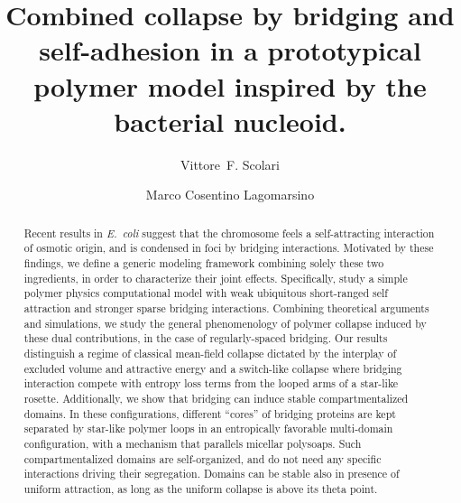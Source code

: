 \documentclass[
preprint,
a4paper,
12pt,
superscriptaddress,
pre]{revtex4}
\begin{document}
 

\title{Combined collapse by bridging and self-adhesion in a
  prototypical polymer model inspired by the bacterial nucleoid.}

\author{Vittore~F. Scolari}
%
%
%
% 
%
\author{Marco Cosentino Lagomarsino}
%

\begin{abstract}
  Recent results in \emph{E.~coli} suggest that the chromosome feels a
  self-attracting interaction of osmotic origin, and is condensed in
  foci by bridging interactions.
  Motivated by these findings, we define a generic modeling framework
  combining solely these two ingredients, in order to characterize
  their joint effects. Specifically, study a simple polymer physics
  computational model with weak ubiquitous short-ranged self
  attraction and stronger sparse bridging interactions.  Combining
  theoretical arguments and simulations, we study the general
  phenomenology of polymer collapse induced by these dual
  contributions, in the case of regularly-spaced bridging.
%
  Our results distinguish a regime of classical mean-field collapse
  dictated by the interplay of excluded volume and attractive energy
  and a switch-like collapse where bridging interaction compete with
  entropy loss terms from the looped arms of a star-like rosette.
%
  Additionally, we show that bridging can induce stable
  compartmentalized domains. In these configurations, different
  ``cores'' of bridging proteins are kept separated by star-like
  polymer loops in an entropically favorable multi-domain
  configuration, with a mechanism that parallels micellar polysoaps.
  Such compartmentalized domains are self-organized, and do not need
  any specific interactions driving their segregation.  Domains can be
  stable also in presence of uniform attraction, as long as the
  uniform collapse is above its theta point.
\end{abstract}
\end{document}
